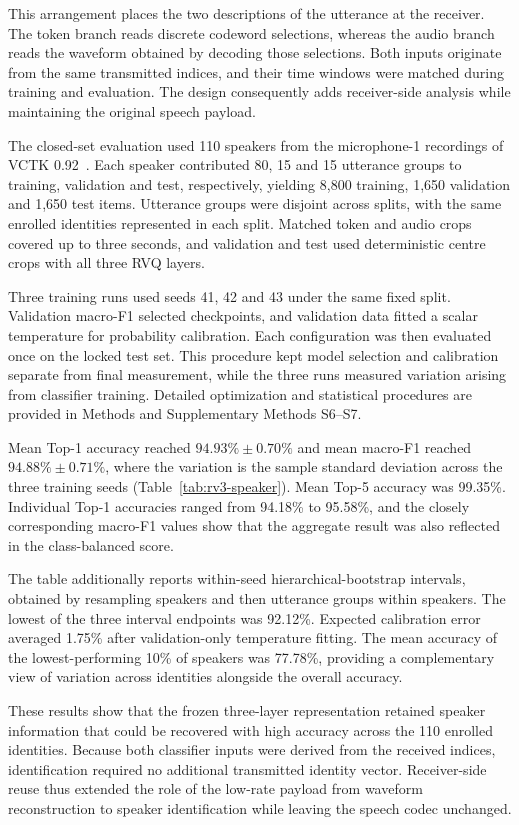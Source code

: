 This arrangement places the two descriptions of the utterance at the receiver. The token branch reads discrete codeword selections, whereas the audio branch reads the waveform obtained by decoding those selections. Both inputs originate from the same transmitted indices, and their time windows were matched during training and evaluation. The design consequently adds receiver-side analysis while maintaining the original speech payload.

The closed-set evaluation used 110 speakers from the microphone-1 recordings of VCTK 0.92~\cite{vctk}. Each speaker contributed 80, 15 and 15 utterance groups to training, validation and test, respectively, yielding 8,800 training, 1,650 validation and 1,650 test items. Utterance groups were disjoint across splits, with the same enrolled identities represented in each split. Matched token and audio crops covered up to three seconds, and validation and test used deterministic centre crops with all three RVQ layers.

Three training runs used seeds 41, 42 and 43 under the same fixed split. Validation macro-F1 selected checkpoints, and validation data fitted a scalar temperature for probability calibration. Each configuration was then evaluated once on the locked test set. This procedure kept model selection and calibration separate from final measurement, while the three runs measured variation arising from classifier training. Detailed optimization and statistical procedures are provided in Methods and Supplementary Methods S6--S7.

\balance
Mean Top-1 accuracy reached $94.93\%\pm0.70\%$ and mean macro-F1 reached $94.88\%\pm0.71\%$, where the variation is the sample standard deviation across the three training seeds (Table~\ref{tab:rv3-speaker}). Mean Top-5 accuracy was 99.35\%. Individual Top-1 accuracies ranged from 94.18\% to 95.58\%, and the closely corresponding macro-F1 values show that the aggregate result was also reflected in the class-balanced score.

The table additionally reports within-seed hierarchical-bootstrap intervals, obtained by resampling speakers and then utterance groups within speakers. The lowest of the three interval endpoints was 92.12\%. Expected calibration error averaged 1.75\% after validation-only temperature fitting. The mean accuracy of the lowest-performing 10\% of speakers was 77.78\%, providing a complementary view of variation across identities alongside the overall accuracy.

These results show that the frozen three-layer representation retained speaker information that could be recovered with high accuracy across the 110 enrolled identities. Because both classifier inputs were derived from the received indices, identification required no additional transmitted identity vector. Receiver-side reuse thus extended the role of the low-rate payload from waveform reconstruction to speaker identification while leaving the speech codec unchanged.
